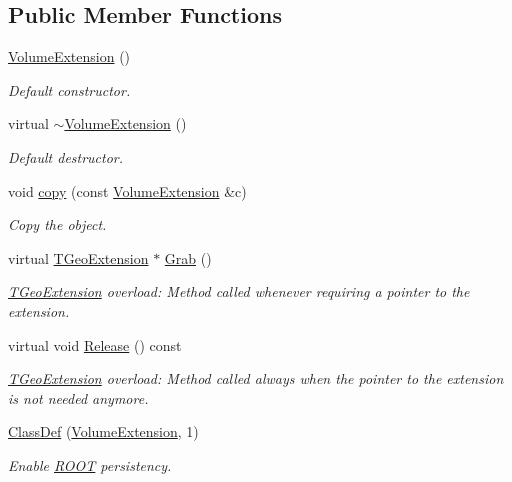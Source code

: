\subsection*{Public Member Functions}
\begin{DoxyCompactItemize}
\item 
\hyperlink{class_d_d4hep_1_1_geometry_1_1_volume_extension_aa9342f53440b4c2c5e56c848868368a5}{VolumeExtension} ()
\begin{DoxyCompactList}\small\item\em Default constructor. \item\end{DoxyCompactList}\item 
virtual \hyperlink{class_d_d4hep_1_1_geometry_1_1_volume_extension_a86b8adbb7fefd161d386f958db8b9be4}{$\sim$VolumeExtension} ()
\begin{DoxyCompactList}\small\item\em Default destructor. \item\end{DoxyCompactList}\item 
void \hyperlink{class_d_d4hep_1_1_geometry_1_1_volume_extension_a9384fd683e751216c07236b8f1e400c2}{copy} (const \hyperlink{class_d_d4hep_1_1_geometry_1_1_volume_extension}{VolumeExtension} \&c)
\begin{DoxyCompactList}\small\item\em Copy the object. \item\end{DoxyCompactList}\item 
virtual \hyperlink{class_t_geo_extension}{TGeoExtension} $\ast$ \hyperlink{class_d_d4hep_1_1_geometry_1_1_volume_extension_adc072e1c3a4be273940579938c6be398}{Grab} ()
\begin{DoxyCompactList}\small\item\em \hyperlink{class_t_geo_extension}{TGeoExtension} overload: Method called whenever requiring a pointer to the extension. \item\end{DoxyCompactList}\item 
virtual void \hyperlink{class_d_d4hep_1_1_geometry_1_1_volume_extension_ad61d398432c27ba62103ba5daa1d431d}{Release} () const 
\begin{DoxyCompactList}\small\item\em \hyperlink{class_t_geo_extension}{TGeoExtension} overload: Method called always when the pointer to the extension is not needed anymore. \item\end{DoxyCompactList}\item 
\hyperlink{class_d_d4hep_1_1_geometry_1_1_volume_extension_abdf0afaa48f61a81e56d99f4a7f2ae6b}{ClassDef} (\hyperlink{class_d_d4hep_1_1_geometry_1_1_volume_extension}{VolumeExtension}, 1)
\begin{DoxyCompactList}\small\item\em Enable \hyperlink{namespace_r_o_o_t}{ROOT} persistency. \item\end{DoxyCompactList}\end{DoxyCompactItemize}
